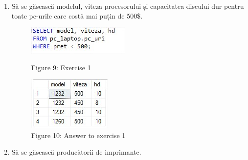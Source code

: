 \renewcommand{\labelenumi}{\arabic{enumi})}
\begin{enumerate}
	\item Să se găsească modelul, viteza procesorului și capacitatea discului dur pentru toate pc-urile care costă mai puțin de 500\$. 
	
\begin{figure}[H]
	\centering
		\includegraphics[width=\linewidth]{screens/11.jpg}
		\caption*{Figure 9: Exercise 1}
		\label{}
	\endminipage\hfill
		\includegraphics[width=\linewidth]{screens/11ans.jpg}
		\caption*{Figure 10: Answer to exercise 1}
	\endminipage
\end{figure}

	\item Să se găsească producătorii de imprimante.
	

\end{enumerate}
